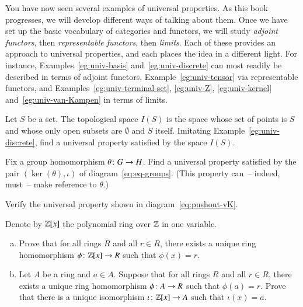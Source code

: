 You have now seen several examples of universal properties.  As this book
progresses, we will develop different ways of talking about them.  Once we
have set up the basic vocabulary of categories and functors, we will study
\emph{adjoint functors}, then \emph{representable functors}, then
\emph{limits}.  Each of these provides an approach to universal properties,
and each places the idea in a different light.  For instance,
Examples~\ref{eg:univ-basis} and~\ref{eg:univ-discrete} can most readily be
described in terms of adjoint functors, Example~\ref{eg:univ-tensor} via
representable functors, and Examples~\ref{eg:univ-terminal-set},
\ref{eg:univ-Z}, \ref{eg:univ-kernel} and~\ref{eg:univ-van-Kampen} in terms
of limits.%
%


\exs


\begin{iquestion}
Let $S$ be a set.  The %
%
%
%
topological space $I(S)$%
%
%
is the space whose set of points is $S$ and whose only open subsets are
$\emptyset$ and $S$ itself.  Imitating Example~\ref{eg:univ-discrete}, find
a universal property satisfied by the space $I(S)$.
\end{iquestion}


\begin{iquestion}        
\label{ex:ker-groups}
Fix a group homomorphism $\theta\from G \to H$.  Find a universal property
satisfied by the pair $(\ker(\theta), \iota)$%
%
%
of diagram~\eqref{eq:eq-groups}.  (This property can~-- indeed, must~-- make
reference to $\theta$.)
\end{iquestion}


\begin{iquestion}
Verify the universal property shown in diagram~\eqref{eq:pushout-vK}.
\end{iquestion}


\begin{iquestion}       
\label{ex:Zx}
Denote by $\mathbb{Z}[x]$%
%
%
the polynomial%
%
%
ring over $\mathbb{Z}$ in one variable.
% 
\begin{enumerate}[(b)]
\item   
\label{part:Zx-main}
Prove that for all rings $R$ and all $r \in R$, there exists a unique ring
homomorphism $\phi\from \integers[x] \to R$ such that $\phi(x) = r$.

\item 
Let $A$ be a ring and $a \in A$.  Suppose that for all rings $R$ and all
$r \in R$, there exists a unique ring homomorphism $\phi\from A \to R$ such that
$\phi(a) = r$.  Prove that there is a unique isomorphism $\iota\from
\integers[x] \to A$ such that $\iota(x) = a$.  
\end{enumerate}
\end{iquestion}


